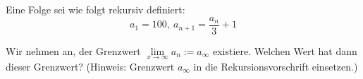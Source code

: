 \item
Eine Folge sei wie folgt rekursiv definiert: 
$$a_1 = 100,\ a_{n+1}=\frac{a_n}{3}+1$$

Wir nehmen an, der Grenzwert $\lim\limits_{x\to\infty}a_n := a_\infty$ existiere. Welchen Wert hat dann dieser Grenzwert? (Hinweis: Grenzwert $a_\infty$ in die Rekursionsvorschrift einsetzen.)

